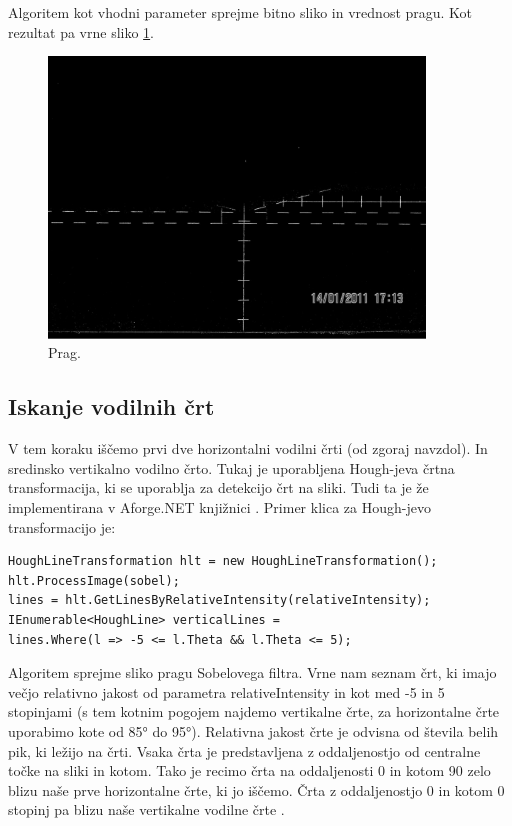 \documentclass[oneside, a4paper, 12pt]{book}
\begin{document}
Algoritem kot vhodni parameter sprejme bitno sliko in vrednost pragu. Kot rezultat pa vrne sliko \ref{pic:treshold}.

\begin{figure}
\begin{center}
\includegraphics[width=10cm]{slike/treshold.jpg}
\end{center}
\caption{Prag.}
\label{pic:treshold}
\end{figure}


\subsection{Iskanje vodilnih črt}
V tem koraku iščemo prvi dve horizontalni vodilni črti (od zgoraj navzdol). In sredinsko vertikalno vodilno črto. Tukaj je uporabljena Hough-jeva črtna transformacija, ki se uporablja za detekcijo črt na sliki. Tudi ta je že implementirana v Aforge.NET knjižnici \cite{hough}. Primer klica za Hough-jevo transformacijo je:

\begin{verbatim}
HoughLineTransformation hlt = new HoughLineTransformation();
hlt.ProcessImage(sobel);
lines = hlt.GetLinesByRelativeIntensity(relativeIntensity);
IEnumerable<HoughLine> verticalLines = 
lines.Where(l => -5 <= l.Theta && l.Theta <= 5);
\end{verbatim}


Algoritem sprejme sliko pragu Sobelovega filtra. Vrne nam seznam črt, ki imajo večjo relativno jakost od parametra relativeIntensity \cite{hough} in kot med -5 in 5 stopinjami (s tem kotnim pogojem najdemo vertikalne črte, za horizontalne črte uporabimo kote od 85° do 95°). Relativna jakost črte je odvisna od števila belih pik, ki ležijo na črti. Vsaka črta je predstavljena z oddaljenostjo od centralne točke na sliki in kotom. Tako je recimo črta na oddaljenosti 0 in kotom 90 zelo blizu naše prve horizontalne črte, ki jo iščemo. Črta z oddaljenostjo 0 in kotom 0 stopinj pa blizu naše vertikalne vodilne črte \cite{hough}. 
\end{document}
